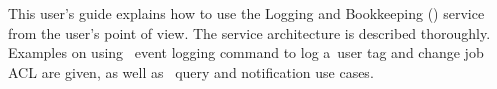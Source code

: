 This user's guide explains how to use the Logging and Bookkeeping (\LB) service
from the user's point of view. The service architecture is described
thoroughly. Examples on using \LB\ event logging command to log a~user tag and
change job ACL are given, as well as \LB\ query and notification use cases.

